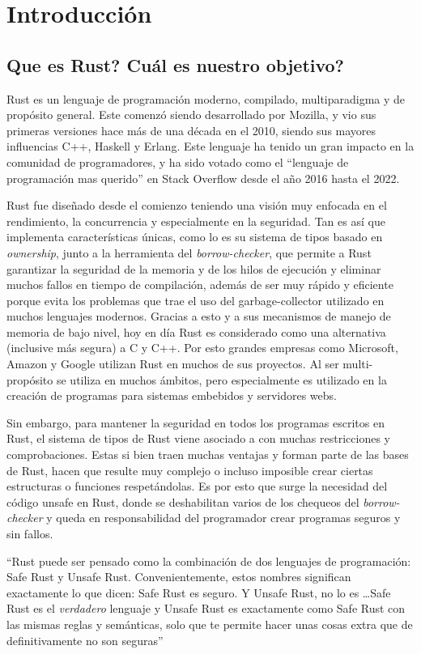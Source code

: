 \chapter{Introducción}

\section{Que es Rust? Cuál es nuestro objetivo?}

Rust es un lenguaje de programación moderno, compilado, multiparadigma y de propósito general. Este comenzó siendo desarrollado por Mozilla, y vio sus primeras versiones hace más de una década en el 2010, siendo sus mayores influencias C++, Haskell y Erlang. Este lenguaje ha tenido un gran impacto en la comunidad de programadores, y ha sido votado como el “lenguaje de programación mas querido” en Stack Overflow desde el año 2016 hasta el 2022.

Rust fue diseñado desde el comienzo teniendo una visión muy enfocada en el rendimiento, la concurrencia y especialmente en la seguridad. Tan es así que implementa características únicas, como lo es su sistema de tipos basado en \textit{ownership}, junto a la herramienta del \textit{borrow-checker}, que permite a Rust garantizar la seguridad de la memoria y de los hilos de ejecución y eliminar muchos fallos en tiempo de compilación, además de ser muy rápido y eficiente porque evita los problemas que trae el uso del garbage-collector utilizado en muchos lenguajes modernos. Gracias a esto y a sus mecanismos de manejo de memoria de bajo nivel, hoy en día Rust es considerado como una alternativa (inclusive más segura) a C y C++. Por esto grandes empresas como Microsoft, Amazon y Google utilizan Rust en muchos de sus proyectos. Al ser multi-propósito se utiliza en muchos ámbitos, pero especialmente es utilizado en la creación de programas para sistemas embebidos y servidores webs.

Sin embargo, para mantener la seguridad en todos los programas escritos en Rust, el sistema de tipos de Rust viene asociado a con muchas restricciones y comprobaciones. Estas si bien traen muchas ventajas y forman parte de las bases de Rust, hacen que resulte muy complejo o incluso imposible crear ciertas estructuras o funciones respetándolas. Es por esto que surge la necesidad del código unsafe en Rust, donde se deshabilitan varios de los chequeos del \textit{borrow-checker} y queda en responsabilidad del programador crear programas seguros y sin fallos.

``Rust puede ser pensado como la combinación de dos lenguajes de programación: Safe Rust y Unsafe Rust. Convenientemente, estos nombres significan exactamente lo que dicen: Safe Rust es seguro. Y Unsafe Rust, no lo es \dots Safe Rust es el \textit{verdadero} lenguaje y Unsafe Rust es exactamente como Safe Rust con las mismas reglas y semánticas, solo que te permite hacer unas cosas extra que de definitivamente no son seguras'' \citep{rustonomicon}

